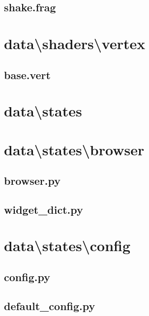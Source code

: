 \documentclass[../main/main.tex]{subfiles}
\begin{document}
\subsection{shake.frag}

\label{src:data/shaders/fragments/shake.frag}

\section{data\textbackslash shaders\textbackslash vertex}
\subsection{base.vert}

\label{src:data/shaders/vertex/base.vert}

\section{data\textbackslash states}
\section{data\textbackslash states\textbackslash browser}
\subsection{browser.py}

\label{src:data/states/browser/browser.py}

\subsection{widget\_dict.py}

\label{src:data/states/browser/widget_dict.py}

\section{data\textbackslash states\textbackslash config}
\subsection{config.py}

\label{src:data/states/config/config.py}

\subsection{default\_config.py}

\label{src:data/states/config/default_config.py}
\end{document}
